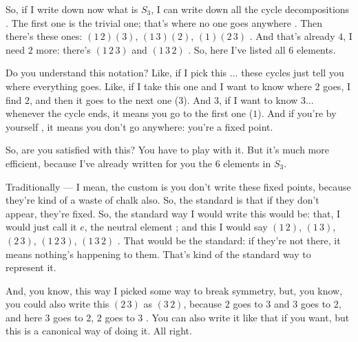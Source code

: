 \begin{speech}[01:08:56 - 01:10:55]
So, if I write down now what is $S_3$, I can write down all the cycle decompositions . The first one is the trivial one; that's where no one goes anywhere . Then there's these ones: $(1\,2)(3)$, $(1\,3)(2)$, $(1)(2\,3)$ . And that's already $4$, I need $2$ more: there's $(1\,2\,3)$ and $(1\,3\,2)$ . So, here I've listed all $6$ elements.

Do you understand this notation? Like, if I pick this ... these cycles just tell you where everything goes. Like, if I take this one  and I want to know where $2$ goes, I find $2$, and then it goes to the next one ($3$). And $3$, if I want to know $3$... whenever the cycle ends, it means you go to the first one ($1$). And if you're by yourself , it means you don't go anywhere: you're a fixed point.

So, are you satisfied with this? You have to play with it. But it's much more efficient, because I've already written for you the $6$ elements in $S_3$.

Traditionally --- I mean, the custom is you don't write these fixed points, because they're kind of a waste of chalk also. So, the standard is that if they don't appear, they're fixed. So, the standard way I would write this would be: that, I would just call it $e$, the neutral element ; and this I would say $(1\,2)$, $(1\,3)$, $(2\,3)$, $(1\,2\,3)$, $(1\,3\,2)$ . That would be the standard: if they're not there, it means nothing's happening to them. That's kind of the standard way to represent it.

And, you know, this way I picked some way to break symmetry, but, you know, you could also write this $(2\,3)$ as $(3\,2)$, because $2$ goes to $3$ and $3$ goes to $2$, and here $3$ goes to $2$, $2$ goes to $3$ . You can also write it like that if you want, but this  is a canonical way of doing it. All right.
\end{speech}

